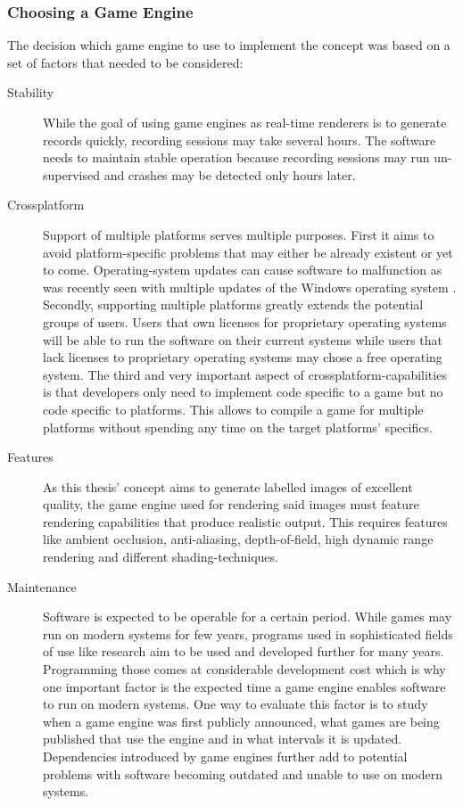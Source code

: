 \subsubsection{Choosing a Game Engine}
The decision which game engine to use to implement the concept was based on a set of factors that needed to be considered:
\begin{description}
\item [Stability] While the goal of using game engines as real-time renderers is to generate records quickly, recording sessions may take several hours. The software needs to maintain stable operation because recording sessions may run un-supervised and crashes may be detected only hours later.
\item [Crossplatform] Support of multiple platforms serves multiple purposes. First it aims to avoid platform-specific problems that may either be already existent or yet to come. Operating-system updates can cause software to malfunction as was recently seen with multiple updates of the Windows operating system \cite{heiseWindowsUpdate}. Secondly, supporting multiple platforms greatly extends the potential groups of users. Users that own licenses for proprietary operating systems will be able to run the software on their current systems while users that lack licenses to proprietary operating systems may chose a free operating system. The third and very important aspect of crossplatform-capabilities is that developers only need to implement code specific to a game but no code specific to platforms. This allows to compile a game for multiple platforms without spending any time on the target platforms' specifics.
\item [Features] As this thesis' concept aims to generate labelled images of excellent quality, the game engine used for rendering said images must feature rendering capabilities that produce realistic output. This requires features like ambient occlusion, anti-aliasing, depth-of-field, high dynamic range rendering and different shading-techniques.
\item [Maintenance] Software is expected to be operable for a certain period. While games may run on modern systems for few years, programs used in sophisticated fields of use like research aim to be used and developed further for many years. Programming those comes at considerable development cost which is why one important factor is the expected time a game engine enables software to run on modern systems. One way to evaluate this factor is to study when a game engine was first publicly announced, what games are being published that use the engine and in what intervals it is updated. Dependencies introduced by game engines further add to potential problems with software becoming outdated and unable to use on modern systems. 

\end{description}
